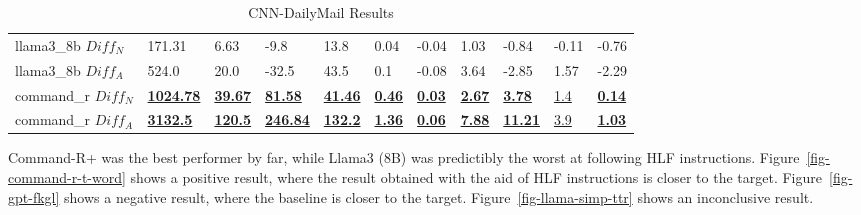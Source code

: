 \documentclass[runningheads,a4paper,11pt]{article}
\begin{document}
\begin{table}[!ht]
{\begin{tabular}{lllllllllll}
            llama3\_8b $Diff_N$ & 171.31                       & 6.63                       & -9.8                        & 13.8                       & 0.04                      & -0.04                     & 1.03                      & -0.84                      & -0.11                   & -0.76                     \\
            llama3\_8b $Diff_A$ & 524.0                        & 20.0                       & -32.5                       & 43.5                       & 0.1                       & -0.08                     & 3.64                      & -2.85                      & 1.57                    & -2.29                     \\
            command\_r $Diff_N$ & \underline{\textbf{1024.78}} & \underline{\textbf{39.67}} & \underline{\textbf{81.58}}  & \underline{\textbf{41.46}} & \underline{\textbf{0.46}} & \underline{\textbf{0.03}} & \underline{\textbf{2.67}} & \underline{\textbf{3.78}}  & \underline{1.4}         & \underline{\textbf{0.14}} \\
            command\_r $Diff_A$ & \underline{\textbf{3132.5}}  & \underline{\textbf{120.5}} & \underline{\textbf{246.84}} & \underline{\textbf{132.2}} & \underline{\textbf{1.36}} & \underline{\textbf{0.06}} & \underline{\textbf{7.88}} & \underline{\textbf{11.21}} & \underline{3.9}         & \underline{\textbf{1.03}} \\
            \bottomrule
        \end{tabular}%
    }
    \caption{CNN-DailyMail Results}
    \label{table-cnn-dailymail-results}
\end{table}

Command-R+ was the best performer by far, while Llama3 (8B) was predictibly the
worst at following HLF instructions.
Figure~\ref{fig-command-r-t-word} shows a positive result, where the result
obtained with the aid of HLF instructions is closer to the target.
Figure~\ref{fig-gpt-fkgl} shows a negative result, where the baseline is closer
to the target.
Figure~\ref{fig-llama-simp-ttr} shows an inconclusive result.
\end{document}
